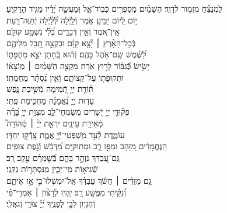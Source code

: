 \documentclass[twoside, openany, parskip=half, 11pt]{book}
\begin{document}
\begin{narrow}


לַמְנַצֵּ֗חַ מִזְמ֥וֹר לְֿדָוִֽד׃ \hfill \break
הַשָּׁמַ֗יִם מְֽֿסַפְּרִ֥ים כְּֿבֽוֹד־אֵ֑ל \hfill וּֽמַעֲשֵׂ֥ה יָ֝דָ֗יו מַגִּ֥יד הָרָקִֽיעַ׃ \\
י֣וֹם לְֿ֭יוֹם יַבִּ֣יעַֽ אֹ֑מֶר \hfill וְֿלַ֥יְֿלָה לְּֿ֝לַ֗יְֿלָה יְֿחַוֶּה־דָּֽעַת׃ \\
אֵֽין־אֹ֭מֶר וְֿאֵ֣ין דְּֿבָרִ֑ים \hfill בְּֿ֝לִ֗י נִשְׁמָ֥ע קוֹלָֽם׃ \\
בְּֿכׇל־הָאָ֨רֶץ ׀ יָ֘צָ֤א קַוָּ֗ם \hfill וּבִקְצֵ֣ה תֵ֭בֵל מִלֵּיהֶ֑ם \\
לַ֝שֶּׁ֗מֶשׁ שָֽׂם־אֹ֥הֶל בָּהֶֽם׃ \hfill
וְֿה֗וּא כְּֿ֭חָתָן יֹצֵ֣א מֵחֻפָּת֑וֹ\\
יָשִׂ֥ישׂ כְּֿ֝גִבּ֗וֹר לָר֥וּץ אֹֽרַח׃ \hfill
מִקְצֵ֤ה הַשָּׁמַ֨יִם ׀ מֽוֹצָא֗וֹ\\ וּתְקוּפָת֥וֹ עַל־קְצוֹתָ֑ם \hfill וְֿאֵ֥ין נִ֝סְתָּ֗ר מֵחַמָּתֽוֹ׃ \\
תּ֘וֹרַ֤ת יְיָ֣ תְּֿ֭מִימָה \hfill מְֿשִׁ֣יבַת נָ֑פֶשׁ \\
עֵד֥וּת יְיָ֥ נֶ֝אֱמָנָ֗ה \hfill מַחְכִּ֥ימַת פֶּֽתִי׃ \\
פִּקּ֘וּדֵ֤י יְיָ֣ יְֿ֭שָׁרִים מְֿשַׂמְּחֵי־לֵ֑ב \hfill מִצְוַ֥ת יְיָ֥ בָּ֝רָ֗ה\\
מְֿאִירַ֥ת עֵינָֽיִם׃ \hfill
יִרְאַ֤ת יְיָ֨ ׀ טְֿהוֹרָה֮ \\
עוֹמֶ֢דֶת לָ֫עַ֥ד \hfill מִֽשְׁפְּטֵי־יְֿיָ֥ אֱמֶ֑ת צָֽדְֿק֥וּ יַחְדָּֽו׃ \\
הַֽנֶּחֱמָדִ֗ים מִ֭זָּהָב וּמִפַּ֣ז רָ֑ב \hfill וּמְתוּקִ֥ים מִ֝דְּבַ֗שׁ וְֿנֹ֣פֶת צוּפִֽים׃ \\
גַּֽם־עַ֭בְדְּךָ נִזְהָ֣ר בָּהֶ֑ם \hfill בְּֿ֝שׇׁמְרָ֗ם עֵ֣קֶב רָֽב׃ \\
שְֿׁגִיא֥וֹת מִֽי־יָבִ֑ין \hfill מִֽנִּסְתָּר֥וֹת נַקֵּֽנִי׃ \\
גַּ֤ם מִזֵּדִ֨ים ׀ חֲשֹׂ֬ךְ עַבְדֶּ֗ךָ \hfill אַֽל־יִמְשְׁלוּ־בִ֣י אָ֣ז אֵיתָ֑ם \\
וְֿ֝נִקֵּ֗יתִי מִפֶּ֥שַֽׁע רָֽב׃ \hfill
יִ֥הְיֽוּ לְֿרָצ֨וֹן ׀ אִמְרֵי־פִ֡י\\
וְֿהֶגְי֣וֹן לִבִּ֣י לְֿפָנֶ֑יךָ \hfill יְ֝יָ֗ צוּרִ֥י וְֿגֹאֲלִֽי׃ \\


\enlargethispage{\baselineskip}


\end{narrow}
\end{document}
